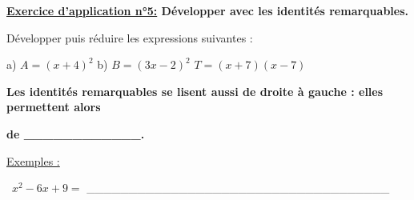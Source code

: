 \documentclass[12pt]{article}
\begin{document}
\begin{mdframed}[
    linewidth=1pt,
    roundcorner=5pt,
    linecolor=RoyalBlue,
    innertopmargin=10pt,
    innerbottommargin=10pt
]
{\color{RoyalBlue}
\textbf{\underline{Exercice d'application n°5:} Développer avec les identités remarquables.}}

\vspace{5pt}
Développer puis réduire les expressions suivantes :

\vspace{5pt}
\hspace{1cm}a) $A = (x+4)^2$ \hspace{2cm}b) $B = (3x-2)^2$ \hspace{2cm} $T = (x+7)(x-7)$

\vspace{0.5cm}
{\color{black!45}\dotfill}

\vspace{0.5cm}
{\color{black!45}\dotfill}

\vspace{0.5cm}
{\color{black!45}\dotfill}

\vspace{0.5cm}
{\color{black!45}\dotfill}

\vspace{20pt}

\end{mdframed}

\vspace{5pt}
\textbf{Les identités remarquables se lisent aussi de droite à gauche : elles permettent alors }

\vspace{10pt}
\textbf{de \_\_\_\_\_\_\_\_\_\_\_\_.}

\vspace{5pt}
\underline{Exemples :}

\vspace{5pt}
\textbullet \ $x^2 - 6x + 9 =$ \_\_\_\_\_\_\_\_\_\_\_\_\_\_\_\_\_\_\_\_\_\_\_\_\_\_\_\_\_\_\_\_\_\_\_\_
\end{document}
